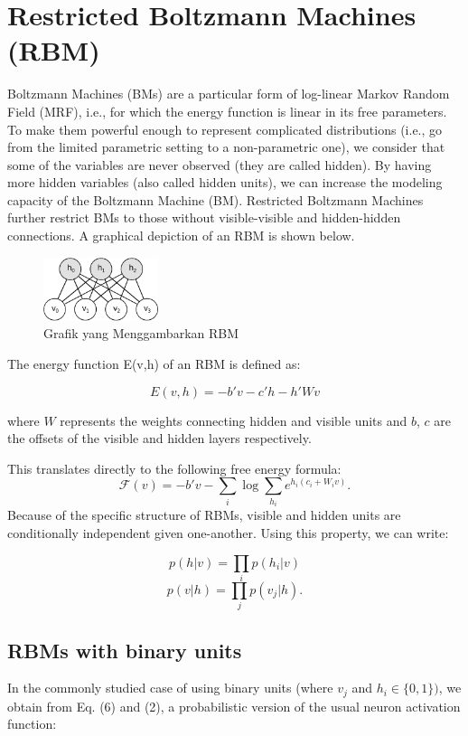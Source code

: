 \documentclass[12pt]{article}
\begin{document}
\section{Restricted Boltzmann Machines (RBM)}
Boltzmann Machines (BMs) are a particular form of log-linear Markov Random Field (MRF), i.e., for which the energy function is linear in its free parameters. To make them powerful enough to represent complicated distributions (i.e., go from the limited parametric setting to a non-parametric one), we consider that some of the variables are never observed (they are called hidden). By having more hidden variables (also called hidden units), we can increase the modeling capacity of the Boltzmann Machine (BM). Restricted Boltzmann Machines further restrict BMs to those without visible-visible and hidden-hidden connections. A graphical depiction of an RBM is shown below.\\
\begin{figure}
	\centering
	\includegraphics[width=0.3\textwidth]
		{pics/rbm.png}
	\caption{Grafik yang Menggambarkan RBM}
	\label{fig:rbm}
\end{figure}

The energy function E(v,h) of an RBM is defined as:

\begin{equation}
E(v,h) = - b'v - c'h - h'Wv
\end{equation}

where $W$ represents the weights connecting hidden and visible units and $b$, $c$ are the offsets of the visible and hidden layers respectively.

This translates directly to the following free energy formula:
\[\mathcal{F}(v)= - b'v - \sum_i \log \sum_{h_i} e^{h_i (c_i + W_i v)}.\]
Because of the specific structure of RBMs, visible and hidden units are conditionally independent given one-another. Using this property, we can write:

\[p(h|v) = \prod_i p(h_i|v)\]
\[p(v|h) = \prod_j p(v_j|h).\]

\subsection{RBMs with binary units}

In the commonly studied case of using binary units (where $v_j$ and $h_i \in
\{0,1\})$, we obtain from Eq. (6) and (2), a probabilistic version of the usual neuron activation function:
\end{document}
